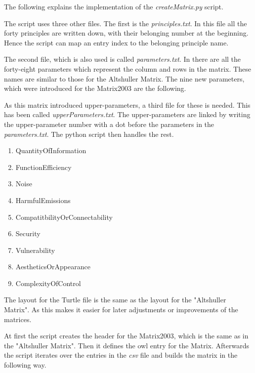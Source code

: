 The following explains the implementation of the \textit{createMatrix.py} script.

The script uses three other files. 
The first is the \textit{principles.txt}.
In this file all the forty principles are written down, with their belonging number at the beginning.
Hence the script can map an entry index to the belonging principle name.

The second file, which is also used is called \textit{parameters.txt}.
In there are all the forty-eight parameters which represent the column and rows in the matrix.
These names are similar to those for the Altshuller Matrix.
The nine new parameters, which were introduced for the Matrix2003 are the following. 

As this matrix introduced upper-parameters, a third file for these is needed.
This has been called \textit{upperParameters.txt}.
The upper-parameters are linked by writing the upper-parameter number with a dot before the parameters in the \textit{parameters.txt}.
The python script then handles the rest.

\begin{enumerate}[noitemsep]
    \item QuantityOfInformation
    \item FunctionEfficiency
    \item Noise
    \item HarmfulEmissions
    \item CompatitbilityOrConnectability
    \item Security
    \item Vulnerability
    \item AestheticsOrAppearance
    \item ComplexityOfControl
\end{enumerate}

The layout for the Turtle file is the same as the layout for the "Altshuller Matrix". 
As this makes it easier for later adjustments or improvements of the matrices.

At first the script creates the header for the Matrix2003, which is the same as in the "Altshuller Matrix".
Then it defines the owl entry for the Matrix.
Afterwards the script iterates over the entries in the \textit{csv} file and builds the matrix in the following way.


